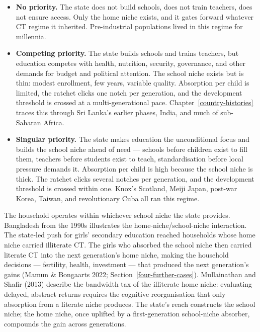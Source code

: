 \documentclass[12pt,letterpaper]{article}
\begin{document}
\begin{itemize}
\item \textbf{No priority.} The state does not build schools, does
not train teachers, does not ensure access. Only the home niche
exists, and it gates forward whatever CT regime it inherited.
Pre-industrial populations lived in this regime for millennia.

\item \textbf{Competing priority.} The state builds schools and
trains teachers, but education competes with health, nutrition,
security, governance, and other demands for budget and political
attention. The school niche exists but is thin: modest enrollment,
few years, variable quality. Absorption per child is limited, the
ratchet clicks one notch per generation, and the development
threshold is crossed at a multi-generational pace.
Chapter~\ref{country-histories} traces this through Sri Lanka's earlier
phases, India, and much of sub-Saharan Africa.

\item \textbf{Singular priority.} The state makes education the
unconditional focus and builds the school niche ahead of need ---
schools before children exist to fill them, teachers before
students exist to teach, standardisation before local pressure
demands it. Absorption per child is high because the school niche
is thick. The ratchet clicks several notches per generation, and
the development threshold is crossed within one. Knox's Scotland,
Meiji Japan, post-war Korea, Taiwan, and revolutionary Cuba all ran
this regime.
\end{itemize}

The household operates within whichever school niche the state
provides. Bangladesh from the 1990s illustrates the
home-niche/school-niche interaction. The state-led push for girls'
secondary education reached households whose home niche carried
illiterate CT. The girls who absorbed the school niche then
carried literate CT into the next generation's home niche, making
the household decisions --- fertility, health, investment --- that
produced the next generation's gains (Mamun \& Bongaarts 2022;
Section~\ref{four-further-cases}). Mullainathan and Shafir (2013) describe
the bandwidth tax of the illiterate home niche: evaluating delayed,
abstract returns requires the cognitive reorganisation that only
absorption from a literate niche produces. The state's reach
constructs the school niche; the home niche, once uplifted by a
first-generation school-niche absorber, compounds the gain across
generations.
\end{document}
